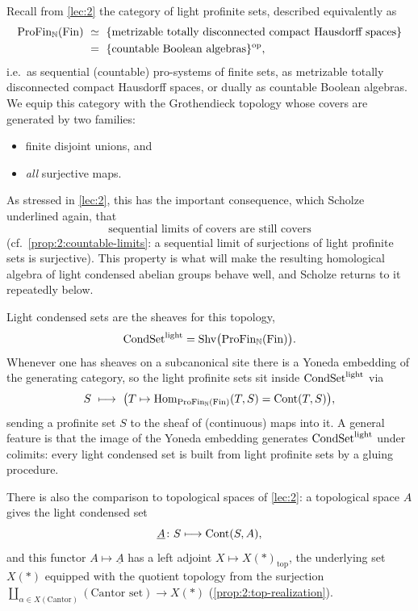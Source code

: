 Recall from \cref{lec:2} the category of light profinite sets, described
equivalently as
\[
\begin{aligned}
\mathrm{ProFin}_{\mathbb{N}}(\mathrm{Fin})
&\ \simeq\ \{\text{metrizable totally disconnected compact Hausdorff spaces}\} \\
&\ =\ \{\text{countable Boolean algebras}\}^{\mathrm{op}},
\end{aligned}
\]
i.e.\ as sequential (countable) pro-systems of finite sets, as metrizable
totally disconnected compact Hausdorff spaces, or dually as countable Boolean
algebras. We equip this category with the Grothendieck topology whose covers are
generated by two families:
\begin{itemize}
\item finite disjoint unions, and
\item \emph{all} surjective maps.
\end{itemize}
As stressed in \cref{lec:2}, this has the important consequence, which Scholze
underlined again, that
\begin{equation}
\label{eq:3:sequential-limits-of-covers}
\text{sequential limits of covers are still covers}
\end{equation}
(cf.\ \cref{prop:2:countable-limits}: a sequential limit of surjections of light
profinite sets is surjective). This property is what will make the resulting
homological algebra of light condensed abelian groups behave well, and Scholze
returns to it repeatedly below.

Light condensed sets are the sheaves for this topology,
\[
\mathrm{CondSet}^{\mathrm{light}}=\mathrm{Shv}\bigl(\mathrm{ProFin}_{\mathbb{N}}(\mathrm{Fin})\bigr).
\]
Whenever one has sheaves on a subcanonical site there is a Yoneda embedding of
the generating category, so the light profinite sets sit inside $\mathrm{CondSet}^{\mathrm{light}}$ via
\begin{equation*}
S\ \longmapsto\ \bigl(T\mapsto \operatorname{Hom}_{\mathrm{ProFin}_{\mathbb{N}}(\mathrm{Fin})}(T,S)
=\operatorname{Cont}(T,S)\bigr),
\end{equation*}
sending a profinite set $S$ to the sheaf of (continuous) maps into it. A general
feature is that the image of the Yoneda embedding generates $\mathrm{CondSet}^{\mathrm{light}}$ under
colimits: every light condensed set is built from light profinite sets by a
gluing procedure.

There is also the comparison to topological spaces of \cref{lec:2}: a
topological space $A$ gives the light condensed set
\begin{equation*}
\underline{A}\colon S\longmapsto \operatorname{Cont}(S,A),
\end{equation*}
and this functor $A\mapsto\underline{A}$ has a left adjoint
$X\mapsto X(*)_{\mathrm{top}}$, the underlying set $X(*)$ equipped with the
quotient topology from the surjection $\coprod_{\alpha\in X(\text{Cantor})}
(\text{Cantor set})\to X(*)$ (\cref{prop:2:top-realization}).

